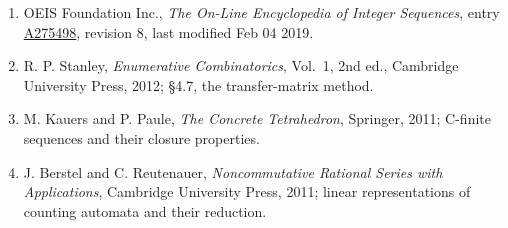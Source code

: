 \documentclass[11pt]{article}
\theoremstyle{definition}
\begin{document}
\begin{enumerate}

\item OEIS Foundation Inc., \emph{The On-Line Encyclopedia of Integer Sequences}, entry \href{https://oeis.org/A275498}{A275498}, revision 8, last modified Feb 04 2019.

\item R. P. Stanley, \emph{Enumerative Combinatorics}, Vol.~1, 2nd ed., Cambridge University Press, 2012; \S4.7, the transfer-matrix method.

\item M. Kauers and P. Paule, \emph{The Concrete Tetrahedron}, Springer, 2011; C-finite sequences and their closure properties.

\item J. Berstel and C. Reutenauer, \emph{Noncommutative Rational Series with Applications}, Cambridge University Press, 2011; linear representations of counting automata and their reduction.

\end{enumerate}
\end{document}
